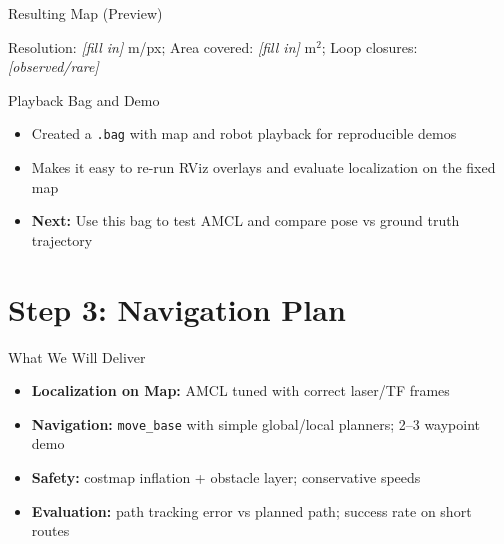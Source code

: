 \documentclass[10pt]{beamer}
\begin{document}
\begin{frame}{Resulting Map (Preview)}
\begin{center}

\vspace{2mm}
{\scriptsize Resolution: \textit{[fill in]} m/px; Area covered: \textit{[fill in]} m$^2$; Loop closures: \textit{[observed/rare]}}
\end{center}
\end{frame}

\begin{frame}{Playback Bag and Demo}
\begin{itemize}
    \item Created a \texttt{.bag} with map and robot playback for reproducible demos
    \item Makes it easy to re-run RViz overlays and evaluate localization on the fixed map
    \item \textbf{Next:} Use this bag to test AMCL and compare pose vs ground truth trajectory
\end{itemize}
\begin{center}
\end{center}
\end{frame}

\section{Step 3: Navigation Plan}

\begin{frame}{What We Will Deliver}
\begin{itemize}
    \item \textbf{Localization on Map:} AMCL tuned with correct laser/TF frames
    \item \textbf{Navigation:} \texttt{move\_base} with simple global/local planners; 2–3 waypoint demo
    \item \textbf{Safety:} costmap inflation + obstacle layer; conservative speeds
    \item \textbf{Evaluation:} path tracking error vs planned path; success rate on short routes
\end{itemize}
\end{frame}
\end{document}
